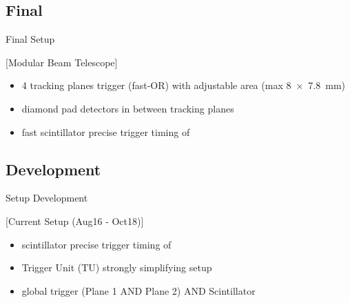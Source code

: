 \subsection{Final}
\begin{frame}{Final Setup}

	[Modular Beam Telescope]\vspace{-10pt}

	\begin{itemize}\itemfill
		\item 4 tracking planes \ra trigger (fast-OR) with adjustable area (max \SI{8x7.8}{\milli\meter})
		\item diamond pad detectors in between tracking planes
		\item fast scintillator \ra precise trigger timing of 
	\end{itemize}

\end{frame}
\subsection{Development}
\begin{frame}{Setup Development}

	[Current Setup (Aug16 - Oct18)]\vspace{-10pt}
	
	\begin{itemize}\itemfill
		\item scintillator \ra precise trigger timing of 
		\item Trigger Unit (TU) \ra strongly simplifying setup
		\item global trigger \ra (Plane 1 AND Plane 2) AND Scintillator
	\end{itemize}
	
\end{frame}
